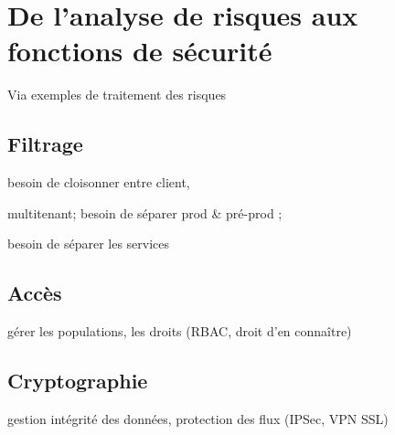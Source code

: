 


\section{De l’analyse de risques aux fonctions de sécurité}
Via exemples de traitement des risques 

\subsection{Filtrage}

besoin de cloisonner entre client, 

multitenant; besoin de séparer prod \& pré-prod ; 

besoin de séparer les services


\subsection{Accès}
gérer les populations, les droits (RBAC, droit d’en connaître)
\subsection{Cryptographie}

gestion intégrité des données, protection des flux (IPSec, VPN SSL)






